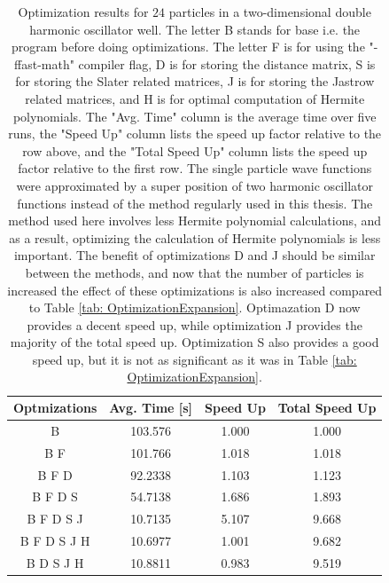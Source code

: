 \documentclass[../main.tex]{subfiles}
\begin{document}
\begin{table}[!ht]
  \centering
  \begin{tabular}{| c | c | c | c |}
    \hline
    Optmizations & Avg. Time [s] & Speed Up & Total Speed Up\\*
    \hline
    B & 103.576 & 1.000 & 1.000\\*
    \hline
    B F & 101.766 & 1.018 & 1.018\\*
    \hline
    B F D & 92.2338 & 1.103 & 1.123\\*
    \hline
    B F D S & 54.7138 & 1.686 & 1.893\\*
    \hline
    B F D S J & 10.7135 & 5.107 & 9.668\\*
    \hline
    B F D S J H & 10.6977 & 1.001 & 9.682\\*
    \hline
    B D S J H & 10.8811 & 0.983 & 9.519\\*
    \hline
  \end{tabular}
  \caption{Optimization results for $24$ particles in a two-dimensional double harmonic oscillator well. The letter B stands for base i.e. the program before doing optimizations. The letter F is for using the "-ffast-math" compiler flag, D is for storing the distance matrix, S is for storing the Slater related matrices, J is for storing the Jastrow related matrices, and H is for optimal computation of Hermite polynomials. The "Avg. Time" column is the average time over five runs, the "Speed Up" column lists the speed up factor relative to the row above, and the "Total Speed Up" column lists the speed up factor relative to the first row. The single particle wave functions were approximated by a super position of two harmonic oscillator functions instead of the method regularly used in this thesis. The method used here involves less Hermite polynomial calculations, and as a result, optimizing the calculation of Hermite polynomials is less important. The benefit of optimizations D and J should be similar between the methods, and now that the number of particles is increased the effect of these optimizations is also increased compared to Table \ref{tab: OptimizationExpansion}. Optimazation D now provides a decent speed up, while optimization J provides the majority of the total speed up. Optimization S also provides a good speed up, but it is not as significant as it was in Table \ref{tab: OptimizationExpansion}.}
  \label{tab: OptimizationSupPos}
\end{table}
\end{document}
